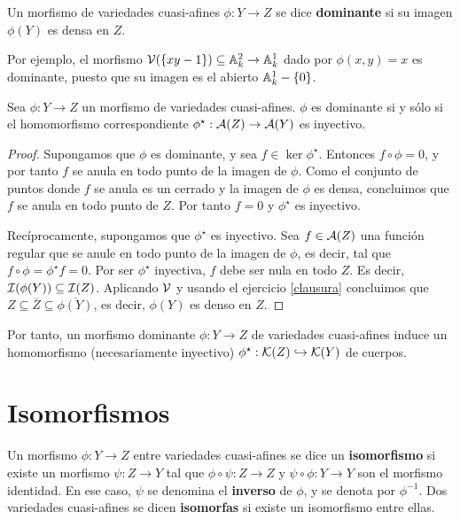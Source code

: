 \documentclass[ACGA.tex]{subfiles}
\begin{document}
\begin{defi}
 Un morfismo de variedades cuasi-afines $\phi:Y\to Z$ se dice {\bf dominante} si su imagen $\phi(Y)$ es densa en $Z$. 
\end{defi}

Por ejemplo, el morfismo $\mathcal{V}(\{xy-1\})\subseteq\mathbb{A}^2_k\to\mathbb{A}^1_k$ dado por $\phi(x,y)=x$ es dominante, puesto que su imagen es el abierto $\mathbb{A}^1_k-\{0\}$.

\begin{prop}\label{dominanteinyectivo}
 Sea $\phi:Y\to Z$ un morfismo de variedades cuasi-afines. $\phi$ es dominante si y sólo si el homomorfismo correspondiente $\phi^\star:\mathcal{A}(Z)\to\mathcal{A}(Y)$ es inyectivo.
\end{prop}

\begin{proof}
 Supongamos que $\phi$ es dominante, y sea $f\in\ker\phi^\star$. Entonces $f\circ\phi=0$, y por tanto $f$ se anula en todo punto de la imagen de $\phi$. Como el conjunto de puntos donde $f$ se anula es un cerrado y la imagen de $\phi$ es densa, concluimos que $f$ se anula en todo punto de $Z$. Por tanto $f=0$ y $\phi^\star$ es inyectivo.

Recíprocamente, supongamos que $\phi^\star$ es inyectivo. Sea $f\in\mathcal{A}(Z)$ una función regular que se anule en todo punto de la imagen de $\phi$, es decir, tal que $f\circ\phi=\phi^\star f=0$. Por ser $\phi^\star$ inyectiva, $f$ debe ser nula en todo $Z$. Es decir, $\mathcal{I}(\phi(Y))\subseteq\mathcal{I}(Z)$. Aplicando $\mathcal{V}$ y usando el ejercicio \ref{clausura} concluimos que $Z\subseteq\overline Z\subseteq\overline{\phi(Y)}$, es decir, $\phi(Y)$ es denso en $Z$. 
\end{proof}

Por tanto, un morfismo dominante $\phi:Y\to Z$ de variedades cuasi-afines induce un homomorfismo (necesariamente inyectivo) $\phi^\star:{\mathcal K}(Z)\hookrightarrow{\mathcal K}(Y)$ de cuerpos.


\section{Isomorfismos}

\begin{defi} Un morfismo $\phi:Y\to Z$ entre variedades cuasi-afines se dice un {\bf isomorfismo} si existe un morfismo $\psi:Z\to Y$ tal que $\phi\circ \psi:Z\to Z$ y $\psi\circ \phi:Y\to Y$ son el morfismo identidad. En ese caso, $\psi$ se denomina el {\bf inverso} de $\phi$, y se denota por $\phi^{-1}$. Dos variedades cuasi-afines se dicen {\bf isomorfas} si existe un isomorfismo entre ellas.
 \end{defi}
\end{document}
